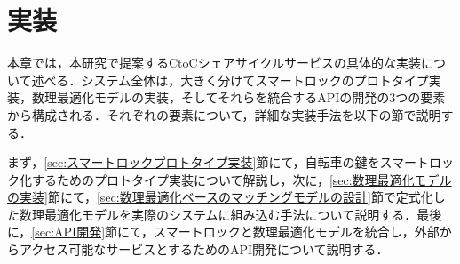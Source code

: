 \section{実装}
  \label{sec:実装}
    \par 本章では，本研究で提案するCtoCシェアサイクルサービスの具体的な実装について述べる．システム全体は，大きく分けてスマートロックのプロトタイプ実装，数理最適化モデルの実装，そしてそれらを統合するAPIの開発の3つの要素から構成される．それぞれの要素について，詳細な実装手法を以下の節で説明する．
    \par まず，\ref{sec:スマートロックプロトタイプ実装}節にて，自転車の鍵をスマートロック化するためのプロトタイプ実装について解説し，次に，\ref{sec:数理最適化モデルの実装}節にて，\ref{sec:数理最適化ベースのマッチングモデルの設計}節で定式化した数理最適化モデルを実際のシステムに組み込む手法について説明する．最後に，\ref{sec:API開発}節にて，スマートロックと数理最適化モデルを統合し，外部からアクセス可能なサービスとするためのAPI開発について説明する．
  
